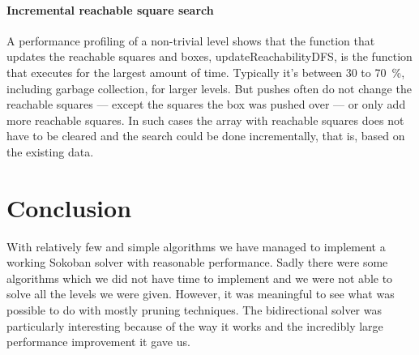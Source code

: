 \documentclass[a4paper,11pt]{article}
\renewcommand{\*}[0]{\cdot}
\begin{document}
\subsection{Incremental reachable square search}

A performance profiling of a non-trivial level shows that the function that
updates the reachable squares and boxes, updateReachabilityDFS, is the function
that executes for the largest amount of time. Typically it's between 30 to
70~\%, including garbage collection, for larger levels. But pushes often do not
change the reachable squares --- except the squares the box was pushed over ---
or only add more reachable squares. In such cases the array with reachable
squares does not have to be cleared and the search could be done incrementally,
that is, based on the existing data.


\part*{Conclusion}


With relatively few and simple algorithms we have managed to implement a
working Sokoban solver with reasonable performance. Sadly there were some
algorithms which we did not have time to implement and we were not able to
solve all the levels we were given. However, it was meaningful to see what was
possible to do with mostly pruning techniques. The bidirectional solver was
particularly interesting because of the way it works and the incredibly large
performance improvement it gave us.



 
\end{document}

